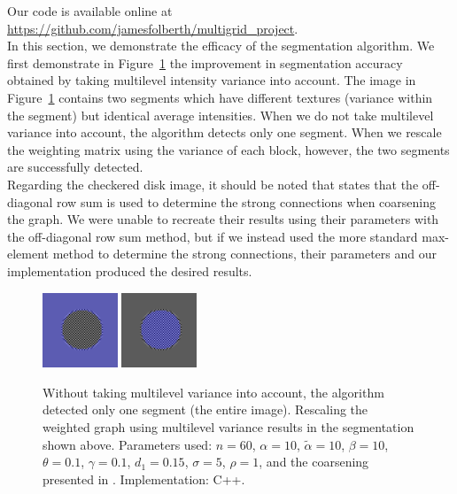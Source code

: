 \documentclass[12pt]{article}%
\begin{document}
Our code is available online at \url{https://github.com/jamesfolberth/multigrid_project}.\\

In this section, we demonstrate the efficacy of the segmentation algorithm. We first demonstrate in Figure~\ref{fig:disk} the improvement in segmentation accuracy obtained by taking multilevel intensity variance into account. The image in Figure~\ref{fig:disk} contains two segments which have different textures (variance within the segment) but identical average intensities. When we do not take multilevel variance into account, the algorithm detects only one segment. When we rescale the weighting matrix using the variance of each block, however, the two segments are successfully detected.\\

Regarding the checkered disk image, it should be noted that \cite{inglis:2010} states that the off-diagonal row sum is used to determine the strong connections when coarsening the graph.  We were unable to recreate their results using their parameters with the off-diagonal row sum method, but if we instead used the more standard max-element method to determine the strong connections, their parameters and our implementation produced the desired results.\\

\begin{figure}[ht]
\centering
\includegraphics[width=0.2\textwidth,height=0.2\textwidth]{checker_disk_good_seg_1.png} \hspace{.45cm}
\includegraphics[width=0.2\textwidth,height=0.2\textwidth]{checker_disk_good_seg_2.png}
\caption{Without taking multilevel variance into account, the algorithm detected only one segment (the entire image). Rescaling the weighted graph using multilevel variance results in the segmentation shown above. Parameters used: $n = 60$, $\alpha = 10$, $\tilde{\alpha} = 10$, $\beta = 10$, $\theta = 0.1$, $\gamma = 0.1$, $d_1 = 0.15$, $\sigma = 5$, $\rho = 1$, and the coarsening presented in \cite{inglis:2010}.  Implementation: C++.}
\label{fig:disk}
\end{figure}
\end{document}
